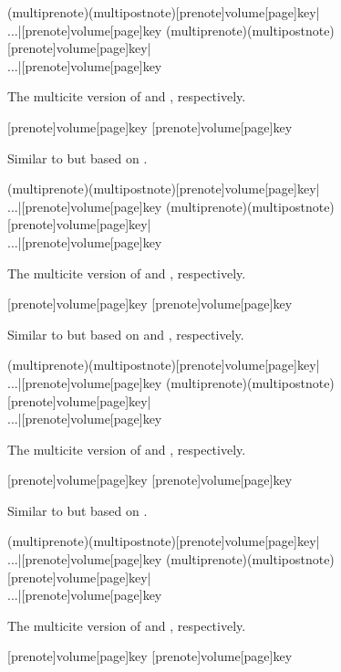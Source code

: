 \documentclass{ltxdockit}[2011/03/25]
\begin{document}
\begin{ltxsyntax}
(multiprenote)(multipostnote)[prenote]{volume}[page]{key}|\\...|[prenote]{volume}[page]{key}
(multiprenote)(multipostnote)[prenote]{volume}[page]{key}|\\...|[prenote]{volume}[page]{key}

The multicite version of  and , respectively.

[prenote]{volume}[page]{key}
[prenote]{volume}[page]{key}

Similar to  but based on .

(multiprenote)(multipostnote)[prenote]{volume}[page]{key}|\\...|[prenote]{volume}[page]{key}
(multiprenote)(multipostnote)[prenote]{volume}[page]{key}|\\...|[prenote]{volume}[page]{key}

The multicite version of  and , respectively.

[prenote]{volume}[page]{key}
[prenote]{volume}[page]{key}

Similar to  but based on  and , respectively.

(multiprenote)(multipostnote)[prenote]{volume}[page]{key}|\\...|[prenote]{volume}[page]{key}
(multiprenote)(multipostnote)[prenote]{volume}[page]{key}|\\...|[prenote]{volume}[page]{key}

The multicite version of  and , respectively.

[prenote]{volume}[page]{key}
[prenote]{volume}[page]{key}

Similar to  but based on .

(multiprenote)(multipostnote)[prenote]{volume}[page]{key}|\\...|[prenote]{volume}[page]{key}
(multiprenote)(multipostnote)[prenote]{volume}[page]{key}|\\...|[prenote]{volume}[page]{key}

The multicite version of  and , respectively.

[prenote]{volume}[page]{key}
[prenote]{volume}[page]{key}


\end{ltxsyntax}
\end{document}
